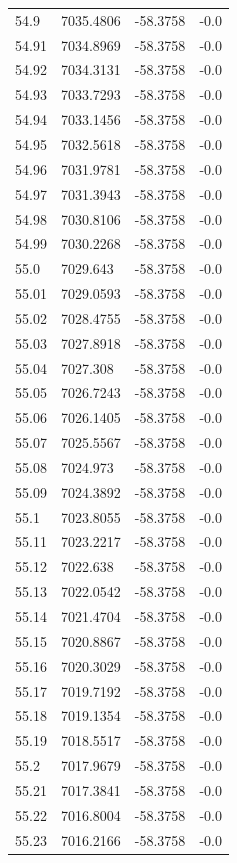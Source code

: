 \begin{table}[H]
\begin{tabular}{llll}
54.9 & 7035.4806 & -58.3758 & -0.0 \\
54.91 & 7034.8969 & -58.3758 & -0.0 \\
54.92 & 7034.3131 & -58.3758 & -0.0 \\
54.93 & 7033.7293 & -58.3758 & -0.0 \\
54.94 & 7033.1456 & -58.3758 & -0.0 \\
54.95 & 7032.5618 & -58.3758 & -0.0 \\
54.96 & 7031.9781 & -58.3758 & -0.0 \\
54.97 & 7031.3943 & -58.3758 & -0.0 \\
54.98 & 7030.8106 & -58.3758 & -0.0 \\
54.99 & 7030.2268 & -58.3758 & -0.0 \\
55.0 & 7029.643 & -58.3758 & -0.0 \\
55.01 & 7029.0593 & -58.3758 & -0.0 \\
55.02 & 7028.4755 & -58.3758 & -0.0 \\
55.03 & 7027.8918 & -58.3758 & -0.0 \\
55.04 & 7027.308 & -58.3758 & -0.0 \\
55.05 & 7026.7243 & -58.3758 & -0.0 \\
55.06 & 7026.1405 & -58.3758 & -0.0 \\
55.07 & 7025.5567 & -58.3758 & -0.0 \\
55.08 & 7024.973 & -58.3758 & -0.0 \\
55.09 & 7024.3892 & -58.3758 & -0.0 \\
55.1 & 7023.8055 & -58.3758 & -0.0 \\
55.11 & 7023.2217 & -58.3758 & -0.0 \\
55.12 & 7022.638 & -58.3758 & -0.0 \\
55.13 & 7022.0542 & -58.3758 & -0.0 \\
55.14 & 7021.4704 & -58.3758 & -0.0 \\
55.15 & 7020.8867 & -58.3758 & -0.0 \\
55.16 & 7020.3029 & -58.3758 & -0.0 \\
55.17 & 7019.7192 & -58.3758 & -0.0 \\
55.18 & 7019.1354 & -58.3758 & -0.0 \\
55.19 & 7018.5517 & -58.3758 & -0.0 \\
55.2 & 7017.9679 & -58.3758 & -0.0 \\
55.21 & 7017.3841 & -58.3758 & -0.0 \\
55.22 & 7016.8004 & -58.3758 & -0.0 \\
55.23 & 7016.2166 & -58.3758 & -0.0 \\

\end{tabular}
\end{table}
